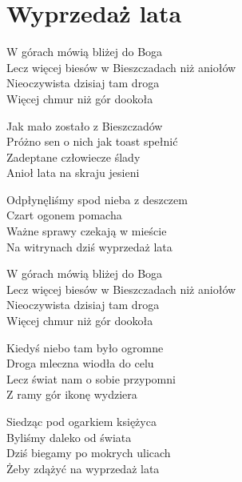 \section{Wyprzedaż lata}
\begin{text}
W górach mówią bliżej do Boga\\
Lecz więcej biesów w Bieszczadach niż aniołów\\
Nieoczywista dzisiaj tam droga\\
Więcej chmur niż gór dookoła

Jak mało zostało z Bieszczadów\\
Próżno sen o nich jak toast spełnić\\
Zadeptane człowiecze ślady\\
Anioł lata na skraju jesieni

Odpłynęliśmy spod nieba z deszczem\\
Czart ogonem pomacha\\
Ważne sprawy czekają w mieście\\
Na witrynach dziś wyprzedaż lata

W górach mówią bliżej do Boga\\
Lecz więcej biesów w Bieszczadach niż aniołów\\
Nieoczywista dzisiaj tam droga\\
Więcej chmur niż gór dookoła

Kiedyś niebo tam było ogromne\\
Droga mleczna wiodła do celu\\
Lecz świat nam o sobie przypomni\\
Z ramy gór ikonę wydziera

Siedząc pod ogarkiem księżyca\\
Byliśmy daleko od świata\\
Dziś biegamy po mokrych ulicach\\
Żeby zdążyć na wyprzedaż lata
\end{text}